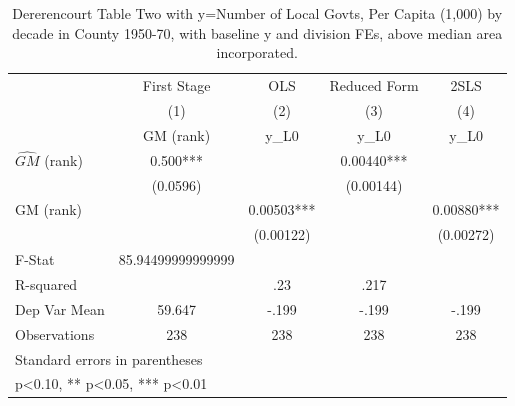 \begin{table}[htbp]\centering
\def\sym#1{\ifmmode^{#1}\else\(^{#1}\)\fi}
\caption{Dererencourt Table Two with y=Number of Local Govts, Per Capita (1,000) by decade in County 1950-70, with baseline y and division FEs, above median area incorporated.}
\begin{tabular}{l*{4}{c}}
\toprule
                    & First Stage   &         OLS   &Reduced Form   &        2SLS   \\
                    &\multicolumn{1}{c}{(1)}&\multicolumn{1}{c}{(2)}&\multicolumn{1}{c}{(3)}&\multicolumn{1}{c}{(4)}\\
                    &\multicolumn{1}{c}{GM  (rank)}&\multicolumn{1}{c}{y\_L0}&\multicolumn{1}{c}{y\_L0}&\multicolumn{1}{c}{y\_L0}\\
\midrule
$\hat{GM}$ (rank)   &       0.500***&               &     0.00440***&               \\
                    &    (0.0596)   &               &   (0.00144)   &               \\
\addlinespace
GM  (rank)          &               &     0.00503***&               &     0.00880***\\
                    &               &   (0.00122)   &               &   (0.00272)   \\
\midrule
F-Stat              &85.94499999999999   &               &               &               \\
R-squared           &               &         .23   &        .217   &               \\
Dep Var Mean        &      59.647   &       -.199   &       -.199   &       -.199   \\
Observations        &         238   &         238   &         238   &         238   \\
\bottomrule
\multicolumn{5}{l}{\footnotesize Standard errors in parentheses}\\
\multicolumn{5}{l}{\footnotesize * p<0.10, ** p<0.05, *** p<0.01}\\
\end{tabular}
\end{table}
